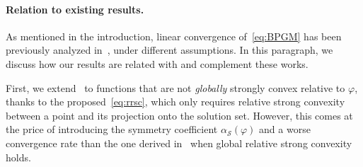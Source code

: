 \documentclass[11pt]{amsart}
\newcommand{\es}[1]{{\color{blue}#1}}
\newcommand{\jc}[1]{{\color{red}#1}}
\begin{document}




\paragraph{\textbf{Relation to existing results.}}
As mentioned in the introduction, linear convergence of~\cref{eq:BPGM} has been previously analyzed in~\cite{Bauschke2019, lu2018relatively, Teboulle2018}, under different assumptions. In this paragraph, we discuss how our results are related with and complement these  works.

First, we extend~\cite{lu2018relatively,Teboulle2018} to functions that are not \emph{globally}  strongly convex relative to $\varphi$, thanks to the proposed~\cref{eq:rrsc}, which only requires relative strong convexity between a point and its projection onto the solution set. However, this comes at the price of introducing the symmetry coefficient $\alpha_\mathcal{S}(\varphi)$ and a worse convergence rate than the one derived in~\cite{lu2018relatively,Teboulle2018} when global relative strong convexity holds. 
\end{document}
